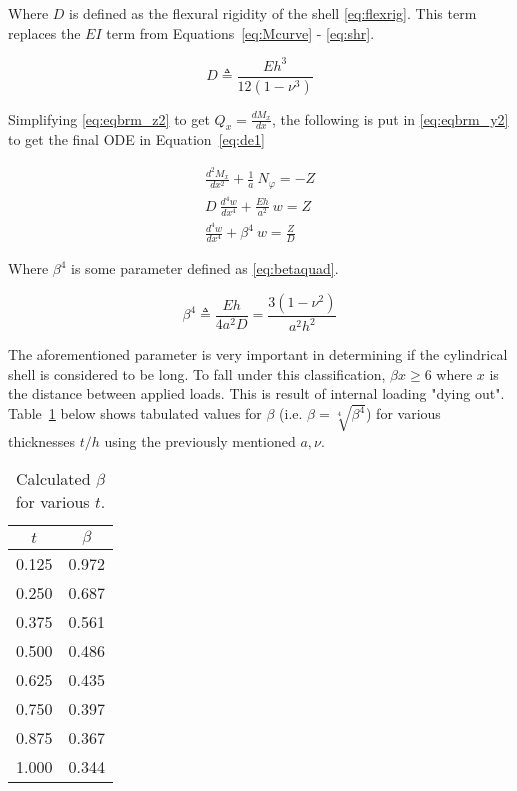 Where $D$ is defined as the flexural rigidity of the shell \ref{eq:flexrig}. This term replaces the $EI$ term from Equations~\ref{eq:Mcurve} - \ref{eq:shr}.

\begin{equation}
	\label{eq:flexrig}
	D \triangleq \frac{Eh^3}{12(1-\nu^3)}
\end{equation}

Simplifying \ref{eq:eqbrm_z2} to get $Q_x = \frac{dM_x}{dx}$, the following is put in \ref{eq:eqbrm_y2} to get the final ODE in Equation~\ref{eq:de1}

\begin{equation}
	\label{eq:de1}
	\begin{aligned}
		\frac{d^2M_x}{dx^2}+\frac{1}{a} \ N_\varphi = -Z \\
		D\ \frac{d^4w}{dx^4}+\frac{Eh}{a^2} \ w = Z      \\
		\frac{d^4w}{dx^4}+\beta^4 \ w = \frac{Z}{D}      
	\end{aligned}
\end{equation} 

Where $\beta^4$ is some parameter defined as \ref{eq:betaquad}.

\begin{equation}
	\label{eq:betaquad}
	\beta^4 \triangleq \frac{Eh}{4a^2D}= \frac{3(1-\nu^2)}{a^2h^2}
\end{equation}

The aforementioned parameter is very important in determining if the cylindrical shell is considered to be long. To fall under this classification, $\beta x \geq 6$ where $x$ is the distance between applied loads. This is result of internal loading "dying out". Table~\ref{table:3_beta} below shows tabulated values for $\beta$ (i.e. $\beta = \sqrt[4]{\beta^4}$) for various thicknesses $t/h$ using the previously mentioned $a, \nu$.

\begin{table}[H]
  \centering
  \caption{Calculated $\beta$ for various $t$.}
    \begin{tabular}{cc}
    \textbf{$t$} & \textbf{$\beta$}\\
    \hline
    0.125 & 0.972 \\
    0.250 & 0.687 \\
    0.375 & 0.561 \\
    0.500 & 0.486 \\
    0.625 & 0.435 \\
    0.750 & 0.397 \\
    0.875 & 0.367 \\
    1.000 & 0.344 \\
    \end{tabular}%
  \label{table:3_beta}
\end{table}

